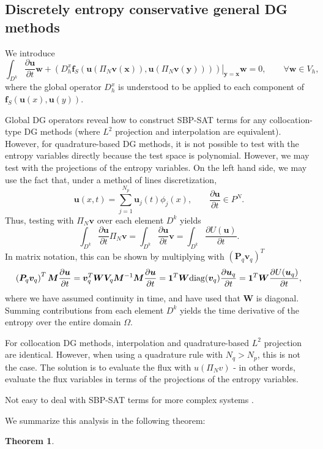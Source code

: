 \documentclass[preprint,10pt]{article}
\theoremstyle{definition}
\theoremstyle{lemma}
\theoremstyle{theorem}
\newtheorem{theorem}{Theorem}
\newcommand{\pd}[2]{\frac{\partial#1}{\partial#2}}
\newcommand{\LRp}[1]{\left( #1 \right)}
\newcommand{\note}[1]{{\color{blue}{#1}}}
\begin{document}
\subsection{Discretely entropy conservative general DG methods}

We introduce 
\[
\int_{D^k}\pd{\bm{u}}{t} \bm{w} + \left.\LRp{D^x_h\bm{f}_S\LRp{\bm{u}(\Pi_N\bm{v}(\bm{x})),\bm{u}(\Pi_N\bm{v}(\bm{y}))}}\right|_{\bm{y}=\bm{x}}\bm{w} = 0, \qquad \forall \bm{w}\in V_h,
\]
where the global operator $D^x_h$ is understood to be applied to each component of $\bm{f}_S\LRp{\bm{u}(x),\bm{u}(y)}$.  

Global DG operators reveal how to construct SBP-SAT terms for any collocation-type DG methods (where $L^2$ projection and interpolation are equivalent).  However, for quadrature-based DG methods, it is not possible to test with the entropy variables directly because the test space is polynomial.  However, we may test with the projections of the entropy variables.  On the left hand side, we may use the fact that, under a method of lines discretization, 
\[
\bm{u}(x,t) = \sum_{j=1}^{N_p} \bm{u}_j(t) \phi_j(x), \qquad \pd{\bm{u}}{t} \in P^N.
\]
Thus, testing with $\Pi_N \bm{v}$ over each element $D^k$ yields  
\[
\int_{D^k} \pd{\bm{u}}{t}\Pi_N \bm{v} = \int_{D^k} \pd{\bm{u}}{t}\bm{v} = \int_{D^k} \pd{U(\bm{u})}{t}.  
\]
In matrix notation, this can be shown by multiplying with $\LRp{\bm{P}_q\bm{v}_q}^T$ 
\[
\LRp{\bm{P}_q\bm{v}_q}^T\bm{M}\pd{\bm{u}}{t} = \bm{v}_q^T\bm{W}\bm{V}_q\bm{M}^{-1}\bm{M}\pd{\bm{u}}{t} = \bm{1}^T \bm{W} {\rm diag}(\bm{v}_q) \pd{\bm{u}_q}{t} = \bm{1}^T \bm{W} \pd{U(\bm{u}_q)}{t},
\]
where we have assumed continuity in time, and have used that $\bm{W}$ is diagonal.  Summing contributions from each element $D^k$ yields the time derivative of the entropy over the entire domain $\Omega$. 


For collocation DG methods, interpolation and quadrature-based $L^2$ projection are identical.  However, when using a quadrature rule with $N_q > N_p$, this is not the case.  The solution is to evaluate the flux with $u(\Pi_N v)$ - in other words, evaluate the flux variables in terms of the projections of the entropy variables.  

Not easy to deal with SBP-SAT terms for more complex systems \cite{ranocha2017extended,ranocha2017comparison}.

We summarize this analysis in the following theorem:
\begin{theorem}
\note{Blah is entropy conservative.  Finish up proof + statement of entropy conservation.}
\end{theorem}
\end{document}
